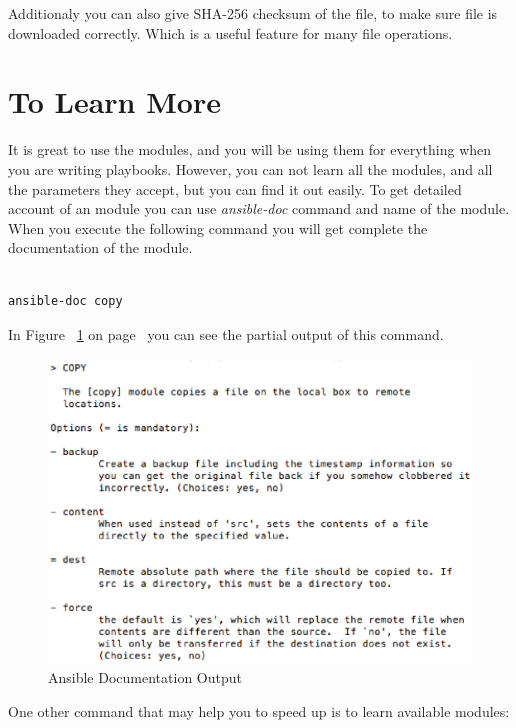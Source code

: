 \documentclass[10pt]{book}
\begin{document}
Additionaly you can also give SHA-256 checksum of the file, to make sure file is 
downloaded correctly. Which is a useful feature for many file operations.



\section{To Learn More}
It is great to use the modules, and you will be using them for everything when 
you are writing playbooks. However, you can not learn all the modules, and all 
the parameters they accept, but you can find it out easily. To get detailed 
account of an module you can use \emph{ansible-doc} command and name of the 
module. When you execute the following command you will get complete the documentation 
of the module.


\begin{Verbatim}

ansible-doc copy

\end{Verbatim}

In Figure ~\ref{fig:ansible-documentation-output} 
on page~\pageref{fig:ansible-documentation-output} you can see the partial 
output of this command.

\begin{figure}[ht]
	\centering
  \includegraphics[width=1.0\textwidth]{figures/ansible-doc-copy.eps}
	\caption{Ansible Documentation Output}
		\label{fig:ansible-documentation-output}
\end{figure}

One other command that may help you to speed up is to learn available modules:
\end{document}
